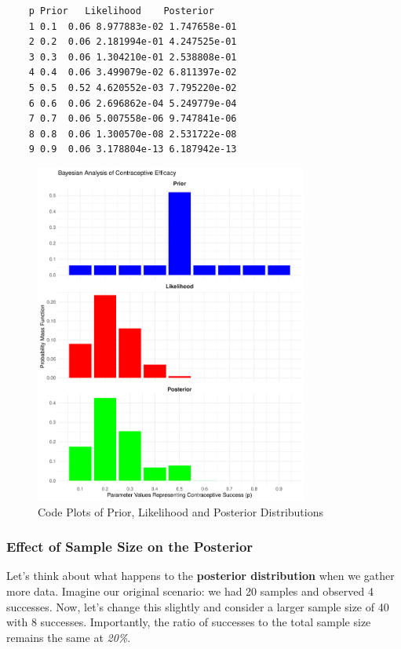 \begin{verbatim}
    p Prior   Likelihood    Posterior
    1 0.1  0.06 8.977883e-02 1.747658e-01
    2 0.2  0.06 2.181994e-01 4.247525e-01
    3 0.3  0.06 1.304210e-01 2.538808e-01
    4 0.4  0.06 3.499079e-02 6.811397e-02
    5 0.5  0.52 4.620552e-03 7.795220e-02
    6 0.6  0.06 2.696862e-04 5.249779e-04
    7 0.7  0.06 5.007558e-06 9.747841e-06
    8 0.8  0.06 1.300570e-08 2.531722e-08
    9 0.9  0.06 3.178804e-13 6.187942e-13
\end{verbatim}
    
\begin{figure}
    \centering
    \includegraphics[width=0.8\textwidth]{chapters/chapter1/codes/bayesian_analysis.png} 
    \caption{Code Plots of Prior, Likelihood and Posterior Distributions}
    \label{fig:bayesian_analysis}
\end{figure}

\subsubsection{Effect of Sample Size on the Posterior}

Let's think about what happens to the \textbf{posterior distribution} when we gather more data. Imagine our original scenario: we had 20 samples and observed 4 successes. Now, let's change this slightly and consider a larger sample size of 40 with 8 successes. Importantly, the ratio of successes to the total sample size remains the same at \textit{20\%}.\\

